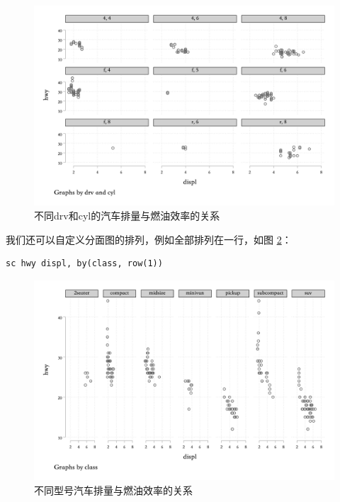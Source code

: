 \documentclass[]{ctexbook}
\begin{document}
\begin{figure}

{\centering \includegraphics[width=1\textwidth]{assets/hwydisplbyfrvcyl} 

}

\caption{不同drv和cyl的汽车排量与燃油效率的关系}\label{fig:hwydisplbyfrvcyl}
\end{figure}

我们还可以自定义分面图的排列，例如全部排列在一行，如图 \ref{fig:hwydisplbyclass2}：

\begin{lstlisting}
sc hwy displ, by(class, row(1))
\end{lstlisting}

\begin{figure}

{\centering \includegraphics[width=1\textwidth]{assets/hwydisplbyclass2} 

}

\caption{不同型号汽车排量与燃油效率的关系}\label{fig:hwydisplbyclass2}
\end{figure}
\end{document}
